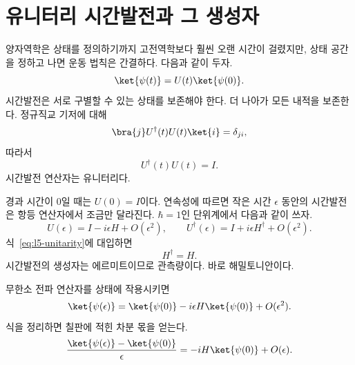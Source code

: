 \begin{classroomqa}\end{classroomqa}

\section{유니터리 시간발전과 그 생성자}

양자역학은 상태를 정의하기까지 고전역학보다 훨씬 오랜 시간이 걸렸지만, 상태 공간을 정하고 나면 운동 법칙은 간결하다. 다음과 같이 두자.
\begin{equation}
\ket{\psi(t)}=U(t)\ket{\psi(0)}.
\label{eq:l5-propagator}
\end{equation}
시간발전은 서로 구별할 수 있는 상태를 보존해야 한다. 더 나아가 모든 내적을 보존한다. 정규직교 기저에 대해
\begin{equation}
\bra{j}U^\dagger(t)U(t)\ket{i}=\delta_{ji},
\end{equation}
따라서
\begin{equation}
U^\dagger(t)U(t)=I.
\label{eq:l5-unitarity}
\end{equation}
시간발전 연산자는 유니터리다.

경과 시간이 0일 때는 \(U(0)=I\)이다. 연속성에 따르면 작은 시간 \(\epsilon\) 동안의 시간발전은 항등 연산자에서 조금만 달라진다. \(\hbar=1\)인 단위계에서 다음과 같이 쓰자.
\begin{equation}
U(\epsilon)=I-i\epsilon H+O(\epsilon^2),
\qquad
U^\dagger(\epsilon)=I+i\epsilon H^\dagger+O(\epsilon^2).
\end{equation}
식~\eqref{eq:l5-unitarity}에 대입하면
\begin{equation}
H^\dagger=H.
\end{equation}
시간발전의 생성자는 에르미트이므로 관측량이다. 바로 해밀토니안이다.

무한소 전파 연산자를 상태에 작용시키면
\begin{equation}
\ket{\psi(\epsilon)}
=\ket{\psi(0)}-i\epsilon H\ket{\psi(0)}+O(\epsilon^2).
\end{equation}
식을 정리하면 칠판에 적힌 차분 몫을 얻는다.
\begin{equation}
\frac{\ket{\psi(\epsilon)}-\ket{\psi(0)}}{\epsilon}
=-iH\ket{\psi(0)}+O(\epsilon).
\end{equation}


